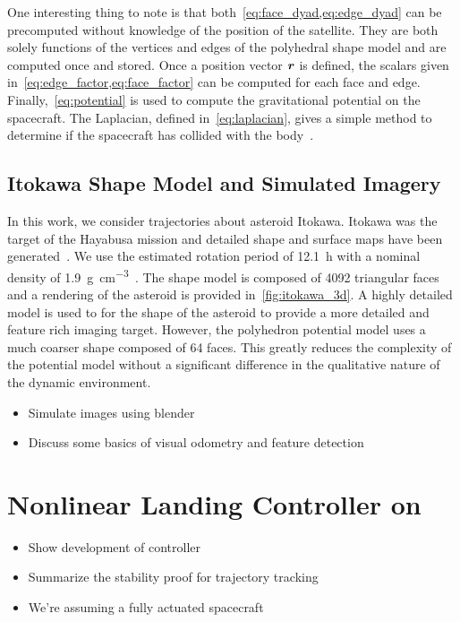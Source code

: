 \documentclass[letterpaper, paper,11pt]{AAS}		%
\begin{document}
One interesting thing to note is that both~\cref{eq:face_dyad,eq:edge_dyad} can be precomputed without knowledge of the position of the satellite.
They are both solely functions of the vertices and edges of the polyhedral shape model and are computed once and stored.
Once a position vector \( \bm{r} \) is defined, the scalars given in~\cref{eq:edge_factor,eq:face_factor} can be computed for each face and edge.
Finally,~\cref{eq:potential} is used to compute the gravitational potential on the spacecraft.
The Laplacian, defined in~\cref{eq:laplacian}, gives a simple method to determine if the spacecraft has collided with the body~\cite{werner1996}. 

\subsection{Itokawa Shape Model and Simulated Imagery}\label{sec:imagery}
In this work, we consider trajectories about asteroid Itokawa.
Itokawa was the target of the Hayabusa mission and detailed shape and surface maps have been generated~\cite{kawaguchi2006,tanimoto2013}.
We use the estimated rotation period of \SI{12.1}{\hour} with a nominal density of \SI{1.9}{\gram\per\centi\meter\cubed}~\cite{fujiwara2006}.
The shape model is composed of \num{4092} triangular faces and a rendering of the asteroid is provided in~\cref{fig:itokawa_3d}.
A highly detailed model is used to for the shape of the asteroid to provide a more detailed and feature rich imaging target. 
However, the polyhedron potential model uses a much coarser shape composed of \num{64} faces. 
This greatly reduces the complexity of the potential model without a significant difference in the qualitative nature of the dynamic environment.

\begin{itemize}
    \item Simulate images using blender
    \item Discuss some basics of visual odometry and feature detection
\end{itemize}    
\section{Nonlinear Landing Controller on \SE}\label{sec:controller}

\begin{itemize}
    \item Show development of \SE controller
    \item Summarize the stability proof for trajectory tracking
    \item We're assuming a fully actuated spacecraft
\end{itemize}
\end{document}
